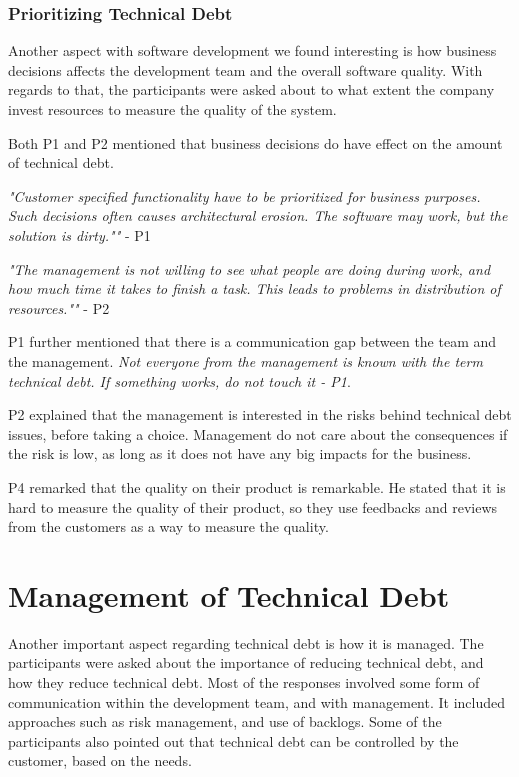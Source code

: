 \subsubsection{Prioritizing Technical Debt}
Another aspect with software development we found interesting is how business decisions affects the development team and the overall software quality. With regards to that, the participants were asked about to what extent the company invest resources to measure the quality of the system.

Both P1 and P2 mentioned that business decisions do have effect on the amount of technical debt. 
\begin{displayquote}
\textit{"Customer specified functionality have to be prioritized for business purposes. Such decisions often causes architectural erosion. The software may work, but the solution is dirty.""} - P1
\end{displayquote}

\begin{displayquote}
\textit{"The management is not willing to see what people are doing during work, and how much time it takes to finish a task. This leads to problems in distribution of resources.""} - P2
\end{displayquote}

P1 further mentioned that there is a communication gap between the team and the management. \textit{Not everyone from the management is known with the term technical debt. If something works, do not touch it - P1}.

P2 explained that the management is interested in the risks behind technical debt issues, before taking a choice. Management do not care about the consequences if the risk is low, as long as it does not have any big impacts for the business. 

P4 remarked that the quality on their product is remarkable. He stated that it is hard to measure the quality of their product, so they use feedbacks and reviews from the customers as a way to measure the quality.

\section{Management of Technical Debt}
\label{sec:managing}
Another important aspect regarding technical debt is how it is managed. The participants were asked about the importance of reducing technical debt, and how they reduce technical debt. Most of the responses involved some form of communication within the development team, and with management. It included approaches such as risk management, and use of backlogs. Some of the participants also pointed out that technical debt can be controlled by the customer, based on the needs.

